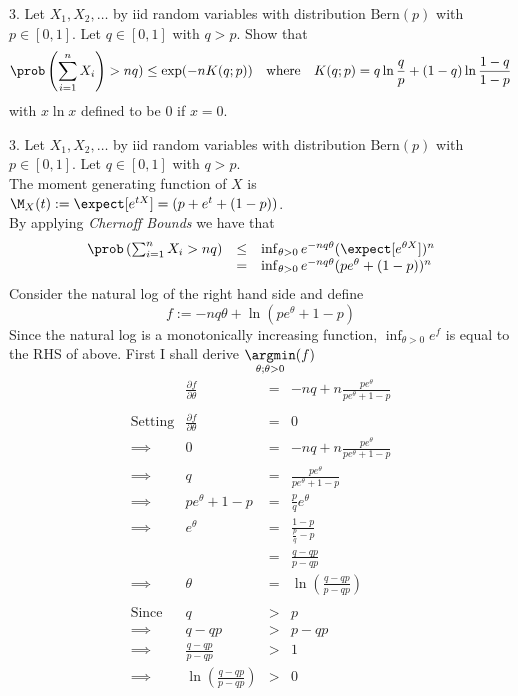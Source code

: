 \documentclass[11pt,a4paper]{article}
\begin{document}
\begin{question}{3.}
  Let $X_1,X_2,\dots$ by iid random variables with distribution $\text{Bern}(p)$ with $p\in[0,1]$. Let $q\in[0,1]$ with $q>p$. Show that
  \[ \prob\left(\sum_{i=1}^nX_i\right)>nq)\leq\text{exp}(-nK(q;p))\quad\text{where}\quad K(q;p)=q\ln\frac{q}p+(1-q)\ln\frac{1-q}{1-p} \]
  with $x\ln x$ defined to be $0$ if $x=0$.
\end{question}

\begin{answer}{3.}
  Let $X_1,X_2,\dots$ by iid random variables with distribution $\text{Bern}(p)$ with $p\in[0,1]$. Let $q\in[0,1]$ with $q>p$.\\
  The moment generating function of $X$ is $\M_X(t):=\expect[e^{tX}]=(p+e^t+(1-p))$.\\
  By applying \textit{Chernoff Bounds} we have that
  \[\begin{array}{rcl}
    \prob\left(\sum_{i=1}^nX_i>nq\right)&\leq&\inf_{\theta>0}e^{-nq\theta}(\expect[e^{\theta X}])^n\\
    &=&\inf_{\theta>0}e^{-nq\theta}(pe^\theta+(1-p))^n
  \end{array}\]
  Consider the natural log of the right hand side and define \[f:=-nq\theta+\ln(pe^\theta+1-p) \]
  Since the natural log is a monotonically increasing function, $\inf_{\theta>0}e^f$ is equal to the RHS of above.
  First I shall derive $\underset{\theta;\theta>0}\argmin (f)$
  \[\begin{array}{rrcl}
    &\frac{\partial f}{\partial\theta}&=&-nq+n\frac{pe^\theta}{pe^\theta+1-p}\\\\
    \text{Setting}&\frac{\partial f}{\partial\theta}&=&0\\
    \implies&0&=&-nq+n\frac{pe^\theta}{pe^\theta+1-p}\\
    \implies&q&=&\frac{pe^\theta}{pe^\theta+1-p}\\
    \implies&pe^\theta+1-p&=&\frac{p}qe^\theta\\
    \implies&e^\theta&=&\frac{1-p}{\frac{p}q-p}\\
    &&=&\frac{q-qp}{p-qp}\\
    \implies&\theta&=&\ln\left(\frac{q-qp}{p-qp}\right)\\\\
    \text{Since}&q&>&p\\
    \implies&q-qp&>&p-qp\\
    \implies&\frac{q-qp}{p-qp}&>&1\\
    \implies&\ln\left(\frac{q-qp}{p-qp}\right)&>&0

\end{array}\]
\end{answer}
\end{document}
